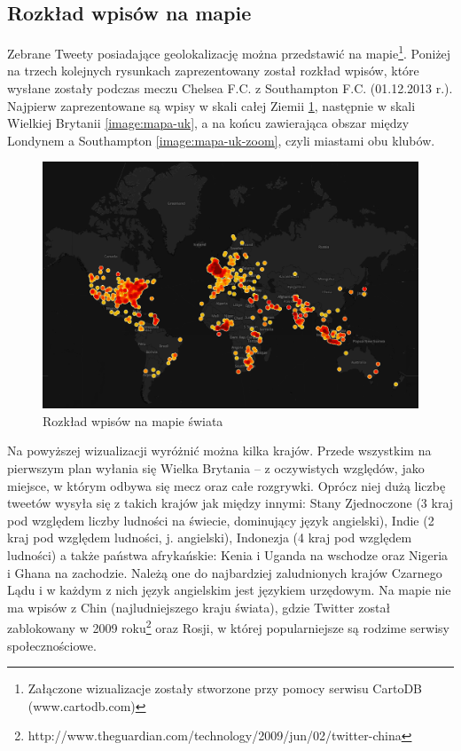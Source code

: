 

\clearpage
\subsection{Rozkład wpisów na mapie}
Zebrane Tweety posiadające geolokalizację można przedstawić na
mapie\footnote{Załączone wizualizacje zostały stworzone przy pomocy serwisu
CartoDB (www.cartodb.com)}.
Poniżej na trzech kolejnych rysunkach zaprezentowany został rozkład wpisów,
które wysłane zostały podczas meczu Chelsea F.C. z Southampton F.C.
(01.12.2013 r.). Najpierw zaprezentowane są wpisy w skali całej Ziemii
\ref{image:mapa-swiata}, następnie w skali Wielkiej Brytanii
\ref{image:mapa-uk}, a na końcu zawierająca obszar między Londynem a Southampton
\ref{image:mapa-uk-zoom}, czyli miastami obu klubów.

\begin{figure}[ht!]
\centering
\includegraphics[width=140mm]{img/geo-chelsea-southampton.png}
\caption{Rozkład wpisów na mapie świata}
\label{image:mapa-swiata}
\end{figure}

Na powyższej wizualizacji wyróżnić można kilka krajów. Przede wszystkim na
pierwszym plan wyłania się Wielka Brytania -- z oczywistych względów, jako
miejsce, w którym odbywa się mecz oraz całe rozgrywki. Oprócz niej dużą liczbę
tweetów wysyła się z takich krajów jak między innymi:
Stany Zjednoczone (3 kraj pod względem liczby ludności na świecie, dominujący
język angielski), Indie (2 kraj pod względem ludności, j. angielski), Indonezja
(4 kraj pod względem ludności) a także państwa afrykańskie: Kenia i Uganda na
wschodze oraz Nigeria i Ghana na zachodzie. Należą one do najbardziej
zaludnionych krajów Czarnego Lądu i w każdym z nich język angielskim jest
językiem urzędowym.
Na mapie nie ma wpisów z Chin (najludniejszego kraju świata), gdzie Twitter
został zablokowany w 2009
roku\footnote{http://www.theguardian.com/technology/2009/jun/02/twitter-china}
oraz Rosji, w której popularniejsze są rodzime serwisy społecznościowe.


